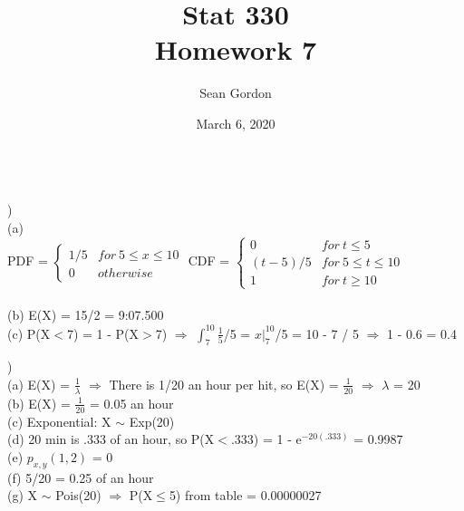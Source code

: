 \documentclass[12pt]{article}
\title{Stat 330\\Homework 7}
\author{Sean Gordon}
\date{March 6, 2020}
\begin{document}
\maketitle


\noindent\hrulefill \\[-.8em]


)\\
\indent (a) \\
\indent \indent PDF =
$
\begin{cases} 
	1/5 & for\ 5 \leq x \leq 10 \\
	0 & otherwise 
\end{cases}
$
\indent \indent CDF = 
$
\begin{cases} 
	0 & for\ t \leq 5\\
	(t - 5)/5 & for\ 5 \leq t \leq 10 \\
	1 & for\ t \ge 10 
\end{cases}
$\\\\

\indent (b) 
E(X) = 15/2 = 9:07.500\\


\indent (c) P(X$<$7) = 1 - P(X$>$7) $\Rightarrow$ {\Large$\int_{7}^{10}\frac{1}{5}$}/5 = $x\Big|_7^{10}$/5 = 10 - 7 / 5 $\Rightarrow$ 1 - 0.6 = 0.4\\


\noindent \hrulefill 


)\\
\indent (a) E(X) = {\Large$\frac{1}{\lambda}$} $\Rightarrow$ There is 1/20 an hour per hit, so E(X) = {\Large$\frac{1}{20}$} $\Rightarrow$ $\lambda$ = 20\\

\indent (b) E(X) = {\Large$\frac{1}{20}$} = 0.05 an hour\\

\indent (c) Exponential: X $\sim$ Exp(20)\\

\indent (d) 20 min is .333 of an hour, so P(X$<$.333) = 1 - e$^{-20(.333)}$ = 0.9987\\

\indent (e) $p_{x, y}(1, 2)$ = 0\\

\indent (f) 5/20 = 0.25 of an hour\\

\indent (g) X $\sim$ Pois(20) $\Rightarrow$ P(X$\leq$5) from table = 0.00000027\\
\end{document}
